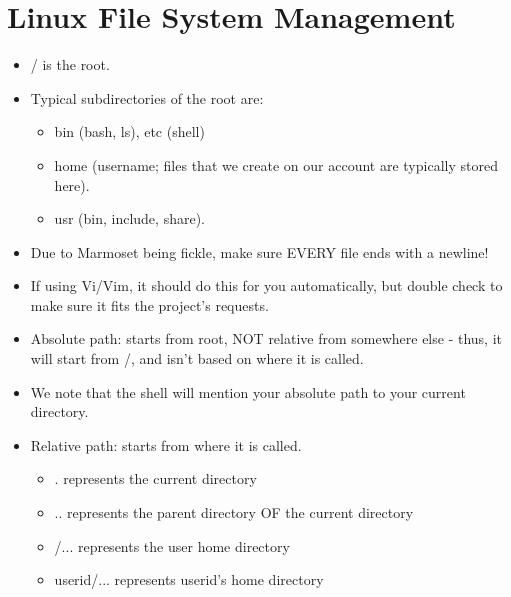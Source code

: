 \documentclass{article}
\begin{document}
\section{Linux File System Management}
\begin{itemize}
\item / is the root.
\item Typical subdirectories of the root are:
\begin{itemize}
\item bin (bash, ls), etc (shell)
\item home (username; files that we create on our account are typically stored here).
\item usr (bin, include, share).
\end{itemize}

\item Due to Marmoset being fickle, make sure EVERY file ends with a newline!
\item If using Vi/Vim, it should do this for you automatically, but double check to make sure it fits the project's requests.

\item Absolute path: starts from root, NOT relative from somewhere else - thus, it will start from /, and isn't based on where it is called.  
\item We note that the shell will mention your absolute path to your current directory.
\item Relative path: starts from where it is called.
\begin{itemize}
\item . represents the current directory
\item .. represents the parent directory OF the current directory
\item \texttildelow/...  represents the user home directory
\item \texttildelow userid/... represents userid's home directory
\end{itemize}


\end{itemize}
\end{document}
